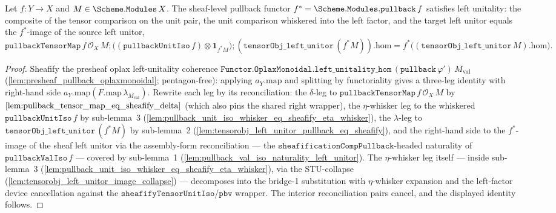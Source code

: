 \begin{lemma}\leanok
  \label{lem:pullback_tensor_map_left_unitality}
  Let \(f : Y \to X\) and \(M \in \Scheme.\mathtt{Modules}\,X\). The sheaf-level pullback functor
  \(f^{*} = \Scheme.\mathtt{Modules.pullback}\,f\) satisfies left unitality: the composite of the
  tensor comparison on the unit pair, the unit comparison whiskered into the left factor, and the
  target left unitor equals the \(f^{*}\)-image of the source left unitor,
  \[
    \mathtt{pullbackTensorMap}\,f\,\mathcal{O}_X\,M
      \mathbin{;} \bigl((\mathtt{pullbackUnitIso}\,f) \otimes \mathbf 1_{f^{*}M}\bigr)
      \mathbin{;} (\mathtt{tensorObj\_left\_unitor}\,(f^{*}M)).\mathrm{hom}
    = f^{*}\bigl((\mathtt{tensorObj\_left\_unitor}\,M).\mathrm{hom}\bigr).
  \]
\end{lemma}
\begin{proof}
  \leanok
  Sheafify the presheaf oplax left-unitality coherence
  \(\mathtt{Functor.OplaxMonoidal.left\_unitality\_hom}\,(\mathtt{pullback}\,\varphi')\,
  M_{\mathrm{val}}\) (\cref{lem:presheaf_pullback_oplaxmonoidal}; pentagon-free): applying
  \(a_Y.\mathrm{map}\) and splitting by functoriality gives a three-leg identity with right-hand side
  \(a_Y.\mathrm{map}(F.\mathrm{map}\,\lambda_{M_{\mathrm{val}}})\). Rewrite each leg by its
  reconciliation: the \(\delta\)-leg to \(\mathtt{pullbackTensorMap}\,f\,\mathcal{O}_X\,M\) by
  \(\cref{lem:pullback_tensor_map_eq_sheafify_delta}\) (which also pins the shared right wrapper), the
  \(\eta\)-whisker leg to the whiskered \(\mathtt{pullbackUnitIso}\,f\) by sub-lemma~3
  (\cref{lem:pullback_unit_iso_whisker_eq_sheafify_eta_whisker}), the \(\lambda\)-leg to
  \(\mathtt{tensorObj\_left\_unitor}\,(f^{*}M)\) by sub-lemma~2
  (\cref{lem:tensorobj_left_unitor_pullback_eq_sheafify}), and the right-hand side to the
  \(f^{*}\)-image of the sheaf left unitor via the assembly-form reconciliation --- the
  \(\mathtt{sheafificationCompPullback}\)-headed naturality of \(\mathtt{pullbackValIso}\,f\) ---
  covered by sub-lemma~1 (\cref{lem:pullback_val_iso_naturality_left_unitor}). The
  \(\eta\)-whisker leg itself --- inside sub-lemma~3 (\cref{lem:pullback_unit_iso_whisker_eq_sheafify_eta_whisker}),
  via the STU-collapse (\cref{lem:tensorobj_left_unitor_image_collapse}) --- decomposes into the
  bridge-1 substitution with \(\eta\)-whisker expansion and the left-factor device cancellation against
  the \(\mathtt{sheafifyTensorUnitIso}\)/\(\mathtt{pbv}\) wrapper. The interior reconciliation pairs
  cancel, and the displayed identity follows.
\end{proof}

